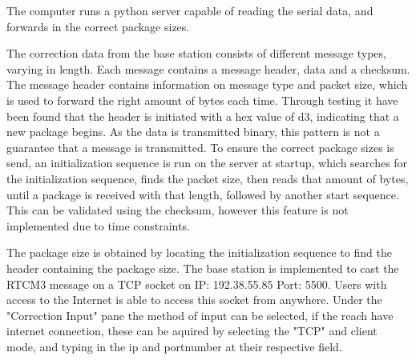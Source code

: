 The computer runs a python server capable of reading the serial data, and forwards in the correct package sizes.

The correction data from the base station consists of different message types, varying in length.
Each message contains a message header, data and a checksum. 
The message header contains information on message type and packet size, which is used to forward the right amount of bytes each time.
Through testing it have been found that the header is initiated with a hex value of d3, indicating that a new package begins. 
As the data is transmitted binary, this pattern is not a guarantee that a message is transmitted. 
To ensure the correct package sizes is send, an initialization sequence is run on the server at startup, which searches for the initialization sequence, finds the packet size, then reads that amount of bytes, until a package is received with that length, followed by another start sequence.
This can be validated using the checksum, however this feature is not implemented due to time constraints. 

The package size is obtained by locating the initialization sequence to find the header containing the package size.
The base station is implemented to cast the RTCM3 message on a TCP socket on IP: 192.38.55.85 Port: 5500. 
Users with access to the Internet is able to access this socket from anywhere.
Under the "Correction Input" pane the method of input can be selected, if the reach have internet connection, these can be aquired by selecting the "TCP" and client mode, and typing in the ip and portnumber at their respective field.



